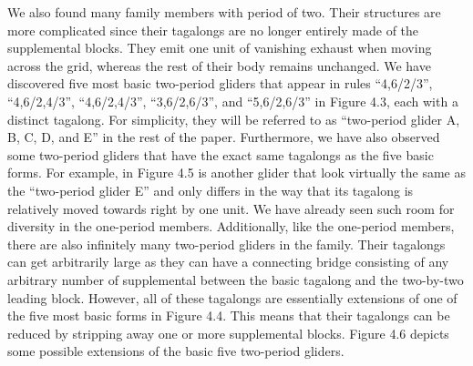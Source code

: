 \documentclass[12pt]{article}
\numberwithin{figure}{section} %
\begin{document}
We also found many family members with period of two. Their structures are more complicated since their tagalongs are no longer entirely made of the supplemental blocks. They emit one unit of vanishing exhaust when moving across the grid, whereas the rest of their body remains unchanged. We have discovered five most basic two-period gliders that appear in rules “4,6/2/3”, “4,6/2,4/3”, “4,6/2,4/3”, “3,6/2,6/3”, and “5,6/2,6/3” in Figure 4.3, each with a distinct tagalong. For simplicity, they will be referred to as “two-period glider A, B, C, D, and E” in the rest of the paper. Furthermore, we have also observed some two-period gliders that have the exact same tagalongs as the five basic forms. For example, in Figure 4.5 is another glider that look virtually the same as the “two-period glider E” and only differs in the way that its tagalong is relatively moved towards right by one unit. We have already seen such room for diversity in the one-period members. Additionally, like the one-period members, there are also infinitely many two-period gliders in the family. Their tagalongs can get arbitrarily large as they can have a connecting bridge consisting of any arbitrary number of supplemental between the basic tagalong and the two-by-two leading block. However, all of these tagalongs are essentially extensions of one of the five most basic forms in Figure 4.4. This means that their tagalongs can be reduced by stripping away one or more supplemental blocks. Figure 4.6 depicts some possible extensions of the basic five two-period gliders. 
\end{document}
